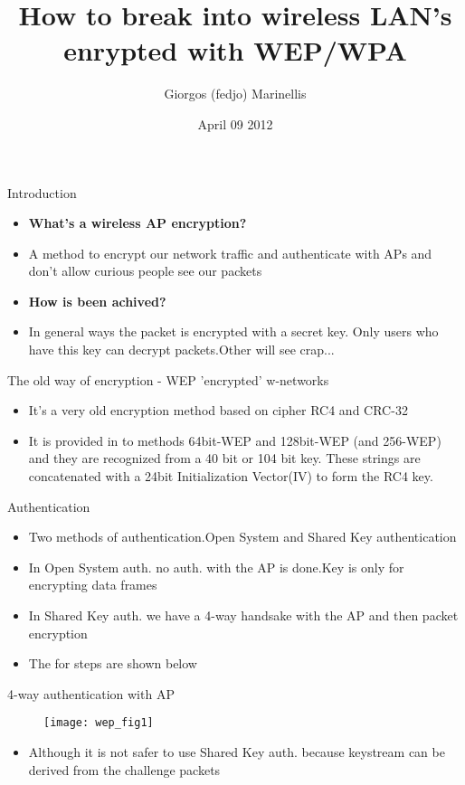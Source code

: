 \documentclass{beamer}
\title[Ethical Hacking Seminars]{How to break into wireless LAN's enrypted with WEP/WPA}
\author{Giorgos (fedjo) Marinellis}
\institute{Foss@Ntua}
\date{April 09 2012}
\begin{document}
\begin{frame}
\titlepage
\end{frame}


\begin{frame}{Introduction}
\begin{itemize}
 \item \textbf{What's a wireless AP encryption?}
 \item A method to encrypt our network traffic and authenticate with APs and don't allow curious people see our packets
 \item \textbf{How is been achived?}
\item In general ways the packet is encrypted with a secret key. Only users who have this key can decrypt
packets.Other will see crap...
\end{itemize}

\end{frame}

\begin{frame}{The old way of encryption - WEP 'encrypted' w-networks }
 \begin{itemize}
  \item It's a very old encryption method based on cipher RC4 and CRC-32
\item It is provided in to methods 64bit-WEP and 128bit-WEP (and 256-WEP) and they are recognized from a 40 bit 
or 104 bit key. These strings are concatenated with a 24bit Initialization Vector(IV) to form the
RC4 key.
 \end{itemize}

\end{frame}

\begin{frame}{Authentication}
 \begin{itemize}
  \item Two methods of authentication.Open System  and Shared Key authentication
\item In Open System auth. no auth. with the AP is done.Key is only for encrypting data frames
\item In Shared Key auth. we have a 4-way handsake with the AP and then packet encryption
\item The for steps are shown below
 \end{itemize}

\end{frame}

\begin{frame}{4-way authentication with AP}
 \begin{figure}
  \texttt{[image: wep\_fig1]}
 \end{figure}
\begin{itemize}
\item Although it is not safer to use Shared Key auth. because keystream can be derived from the challenge packets
\end{itemize}
\end{frame}
\end{document}

